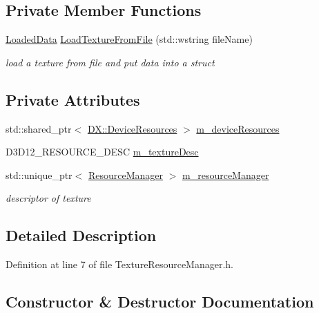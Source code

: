 \subsection*{Private Member Functions}
\begin{DoxyCompactItemize}
\item 
\mbox{\hyperlink{struct_texture_resource_manager_1_1_loaded_data}{Loaded\+Data}} \mbox{\hyperlink{class_texture_resource_manager_ada862570ac9500e22a54662b781c9ec0}{Load\+Texture\+From\+File}} (std\+::wstring file\+Name)
\begin{DoxyCompactList}\small\item\em load a texture from file and put data into a struct \end{DoxyCompactList}\end{DoxyCompactItemize}
\subsection*{Private Attributes}
\begin{DoxyCompactItemize}
\item 
std\+::shared\+\_\+ptr$<$ \mbox{\hyperlink{class_d_x_1_1_device_resources}{D\+X\+::\+Device\+Resources}} $>$ \mbox{\hyperlink{class_texture_resource_manager_a0f99144b70c779807f6f674b1ed5b9b7}{m\+\_\+device\+Resources}}
\item 
D3\+D12\+\_\+\+R\+E\+S\+O\+U\+R\+C\+E\+\_\+\+D\+E\+SC \mbox{\hyperlink{class_texture_resource_manager_a9137a54de5e1a26cf0bb3d37b6b1af93}{m\+\_\+texture\+Desc}}
\item 
std\+::unique\+\_\+ptr$<$ \mbox{\hyperlink{class_resource_manager}{Resource\+Manager}} $>$ \mbox{\hyperlink{class_texture_resource_manager_a789f95efcad1717efd90f7e6ec1ee0ea}{m\+\_\+resource\+Manager}}
\begin{DoxyCompactList}\small\item\em descriptor of texture \end{DoxyCompactList}\end{DoxyCompactItemize}


\subsection{Detailed Description}


Definition at line 7 of file Texture\+Resource\+Manager.\+h.



\subsection{Constructor \& Destructor Documentation}
\mbox{\label{class_texture_resource_manager_ad6183400787dbb2be43b0cb31edd5650}} 
